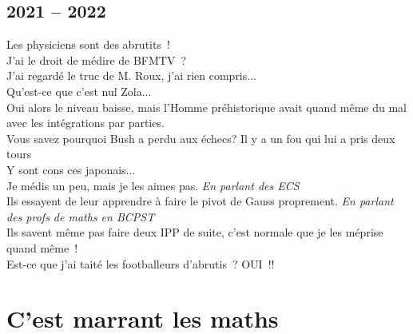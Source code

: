 \documentclass[french, a4paper, openany]{book}
\begin{document}
	\subsection*{2021 -- 2022}
		\noindent \og Les physiciens sont des abrutits~! \fg \\
		\og J'ai le droit de médire de BFMTV~? \fg \\
		\og J'ai regardé le truc de M. Roux, j'ai rien compris... \fg \\
		\og Qu'est-ce que c'est nul Zola... \fg \\
		\og Oui alors le niveau baisse, mais l'Homme préhistorique avait quand même du mal avec les intégrations par parties. \fg \\
		\og Vous savez pourquoi Bush a perdu aux échecs? Il y a un fou qui lui a pris deux tours \fg \\
		\og Y sont cons ces japonais... \fg \\
		\og Je médis un peu, mais je les aimes pas. \fg \emph{En parlant des ECS}\\
		\og Ils essayent de leur apprendre à faire le pivot de Gauss proprement. \fg \emph{En parlant des profs de maths en BCPST} \\
		\og Ils savent même pas faire deux IPP de suite, c'est normale que je les méprise quand même~! \fg \\
		\og Est-ce que j'ai taité les footballeurs d'abrutis~? OUI~!! \fg \\

\section*{C'est marrant les maths}
\end{document}
